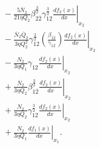 \documentclass[preprint,12pt]{elsarticle}
\begin{document}
\begin{equation}
\begin{split}
&\quad
- \left.
\frac{5 \overline{N}_{2}}{21 \eta Q_2}
\beta_{2\overline{2}}^{\frac{3}{2}}
\gamma_{12}^{\frac{3}{2}}
\frac{d f_2(x)}{dx}
\right|_{x_2} \\
&\quad
- \left.
\frac{\overline{N}_{2} \overline{Q}_{2}}{3 \eta Q_2^{2}}
\gamma_{12}^{\frac{3}{2}}
\left(\frac{\beta_{1\overline{2}}}{\gamma_{12}}\right)
\frac{d f_2(x)}{dx}
\right|_{x_2} \\
&\quad
- \left.
\frac{N_2}{3 \eta Q_1}
\gamma_{12}
\frac{d f_2(x)}{dx}
\right|_{x_2} \\
&\quad
+ \left.
\frac{\overline{N}_{2}}{3 \eta Q_2}
\beta_{1\overline{2}}^{\frac{3}{2}}
\frac{d f_2(x)}{dx}
\right|_{x_2} \\
&\quad
+ \left.
\frac{N_2}{3 \eta Q_2}
\gamma_{12}^{\frac{3}{2}}
\frac{d f_2(x)}{dx}
\right|_{x_2} \\
&\quad
+ \left.
\frac{N_2}{3 \eta Q_1}
\frac{d f_1(x)}{dx}
\right|_{x_1}.
\end{split}
\label{eqn:k12_caseI}
\end{equation}
\end{document}
